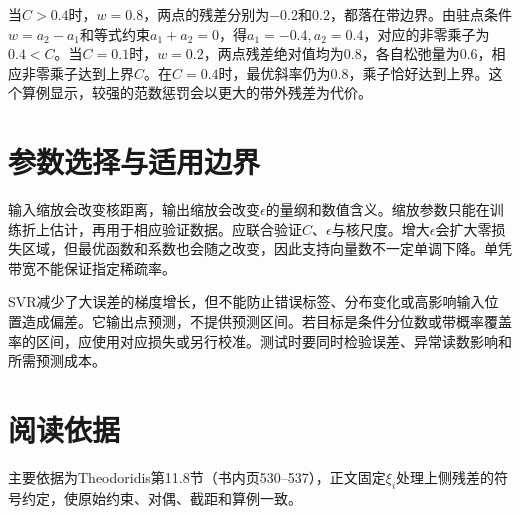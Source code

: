当$C>0.4$时，$w=0.8$，两点的残差分别为$-0.2$和$0.2$，都落在带边界。由驻点条件$w=a_2-a_1$和等式约束$a_1+a_2=0$，得$a_1=-0.4,a_2=0.4$，对应的非零乘子为$0.4<C$。当$C=0.1$时，$w=0.2$，两点残差绝对值均为$0.8$，各自松弛量为$0.6$，相应非零乘子达到上界$C$。在$C=0.4$时，最优斜率仍为$0.8$，乘子恰好达到上界。这个算例显示，较强的范数惩罚会以更大的带外残差为代价。

\section{参数选择与适用边界}
输入缩放会改变核距离，输出缩放会改变$\epsilon$的量纲和数值含义。缩放参数只能在训练折上估计，再用于相应验证数据。应联合验证$C$、$\epsilon$与核尺度。增大$\epsilon$会扩大零损失区域，但最优函数和系数也会随之改变，因此支持向量数不一定单调下降。单凭带宽不能保证指定稀疏率。

SVR减少了大误差的梯度增长，但不能防止错误标签、分布变化或高影响输入位置造成偏差。它输出点预测，不提供预测区间。若目标是条件分位数或带概率覆盖率的区间，应使用对应损失或另行校准。测试时要同时检验误差、异常读数影响和所需预测成本。

\section{阅读依据}
主要依据为Theodoridis第11.8节（书内页530--537），正文固定$\xi_i$处理上侧残差的符号约定，使原始约束、对偶、截距和算例一致。
